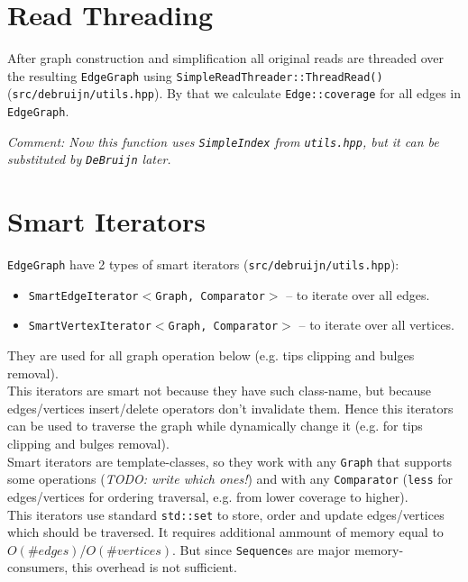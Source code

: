 \documentclass[14pt]{article}
\begin{document}
\section{Read Threading}

After graph construction and simplification all original reads are threaded over the resulting \texttt{EdgeGraph} using \texttt{SimpleReadThreader::ThreadRead()} (\texttt{src/debruijn/utils.hpp}). By that we calculate \texttt{Edge::coverage} for all edges in \texttt{EdgeGraph}.

\textit{Comment: Now this function uses \texttt{SimpleIndex} from \texttt{utils.hpp}, but it can be substituted by \texttt{DeBruijn} later.} 

\section{Smart Iterators}

\texttt{EdgeGraph} have 2 types of smart iterators (\texttt{src/debruijn/utils.hpp}):
\begin{itemize}
\item \texttt{SmartEdgeIterator$<$Graph, Comparator$>$} -- to iterate over all edges.
\item \texttt{SmartVertexIterator$<$Graph, Comparator$>$} -- to iterate over all vertices.
\end{itemize}
They are used for all graph operation below (e.g. tips clipping and bulges removal). \\

This iterators are smart not because they have such class-name, but because edges/vertices insert/delete operators don't invalidate them. Hence this iterators can be used to traverse the graph while dynamically change it (e.g. for tips clipping and bulges removal). \\

Smart iterators are template-classes, so they work with any \texttt{Graph} that supports some operations (\textit{TODO: write which ones!}) and with any \texttt{Comparator} (\texttt{less} for edges/vertices for ordering traversal, e.g. from lower coverage to higher). \\

This iterators use standard \texttt{std::set} to store, order and update edges/vertices which should be traversed. It requires additional ammount of memory equal to $O(\#edges)$/$O(\#vertices)$. But since \texttt{Sequence}s are major memory-consumers, this overhead is not sufficient.
\end{document}
